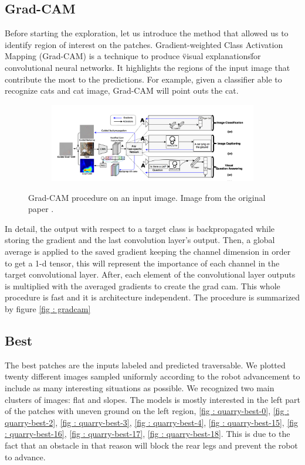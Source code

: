 \subsection{Grad-CAM}
Before starting the exploration, let us introduce the method that allowed us to identify region of interest on the patches. Gradient-weighted Class Activation Mapping (Grad-CAM) \cite{gradcam} is a technique to produce \"visual explanations\" for convolutional neural networks. It highlights the regions of the input image that contribute the most to the predictions. For example, given a classifier able to recognize cats and cat image, Grad-CAM will point outs the cat.
\begin{figure} [htbp]
    \centering
    \begin{subfigure}[b]{1\textwidth}
        \includegraphics[width=\linewidth]{../img/5/grad_cam1.png}
    \end{subfigure}
\caption{Grad-CAM procedure on an input image. Image from the original paper \cite{gradcam}.}
\label{fig: gradcam}
\end{figure}
In detail, the output with respect to a target class is backpropagated while storing the gradient and the last convolution layer's output. Then, a global average is applied to the saved gradient keeping the channel dimension in order to get a 1-d tensor, this will represent the importance of each channel in the target convolutional layer. After, each element of the convolutional layer outputs is multiplied with the averaged gradients to create the grad cam. This whole procedure is fast and it is architecture independent. The procedure is summarized by figure \ref{fig : gradcam}

\subsection{Best}
The best patches are the inputs labeled and predicted traversable. We plotted twenty different images sampled uniformly according to the robot advancement to include as many interesting situations as possible. We recognized two main clusters of images: flat and slopes. The models is mostly interested in the left part of the patches with uneven ground on the left region, \ref{fig : quarry-best-0}, \ref{fig : quarry-best-2}, \ref{fig : quarry-best-3}, \ref{fig : quarry-best-4}, \ref{fig : quarry-best-15}, \ref{fig : quarry-best-16}, \ref{fig : quarry-best-17}, \ref{fig : quarry-best-18}.  This is due to the fact that an obstacle in that reason will block the rear legs and prevent the robot to advance. 

